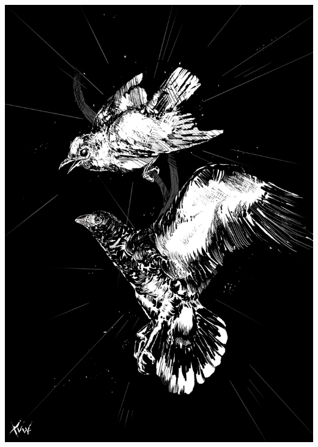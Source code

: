 \thispagestyle{empty}


 \afterpage{\restorepagecolor}


\begin{addmargin}[-1cm]{-4cm}
\begin{center}

    \begingroup
        \Huge\color{white}\spacedallcaps{\myTitle}
    \endgroup
    
    \medskip
    
    \spacedlowsmallcaps{\large\color{white}\myName}

    \vspace*{\fill}
    \begingroup
        \includegraphics[width=0.6\paperwidth, scale=0.8]{Assets/alcaracrara.png}
    \endgroup
    \vspace*{\fill}
\end{center}        
\end{addmargin}